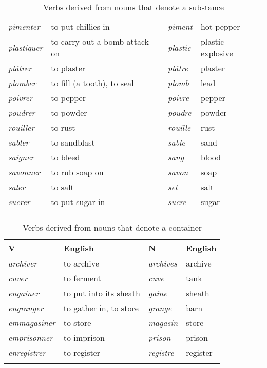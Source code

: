 \documentclass[output=paper]{langsci/langscibook}
\begin{document}
\begin{table}
\begin{tabularx}{\textwidth}{lXll}
\emph{pimenter} & to put chillies in & \emph{piment} & hot pepper\\
\emph{plastiquer} & to carry out a bomb attack on & \emph{plastic} &
plastic explosive\\
\emph{plâtrer} & to plaster & \emph{plâtre} & plaster\\
\emph{plomber} & to fill (a tooth), to seal & \emph{plomb} &
lead\\
\emph{poivrer} & to pepper & \emph{poivre} & pepper\\
\emph{poudrer} & to powder & \emph{poudre} & powder\\
\emph{rouiller} & to rust & \emph{rouille} & rust\\
\emph{sabler} & to sandblast & \emph{sable} & sand\\
\emph{saigner} & to bleed & \emph{sang} & blood\\
\emph{savonner} & to rub soap on & \emph{savon } & soap\\
\emph{saler} & to salt & \emph{sel} & salt\\
\emph{sucrer} & to put sugar in & \emph{sucre} & sugar\\
\lspbottomrule
\end{tabularx}
\caption{Verbs derived from nouns that denote a substance}
\label{tab:Schwarze:9}
\end{table}

\begin{table}
\begin{tabularx}{\textwidth}{lXll}
\lsptoprule
{V} & {English} & {N} &
{English}\\
\midrule

\emph{archiver} & to archive & \emph{archives} & archive\\
\emph{cuver} & to ferment & \emph{cuve} & tank\\
\emph{engainer} & to put into its sheath & \emph{gaine} &
sheath\\
\emph{engranger} & to gather in, to store & \emph{grange} &
barn\\
\emph{emmagasiner} & to store & \emph{magasin} & store\\
\emph{emprisonner} & to imprison & \emph{prison} & prison\\
\emph{enregistrer} & to register & \emph{registre} &
register\\
\lspbottomrule
\end{tabularx}%
\caption{Verbs derived from nouns that denote a container}
\label{tab:Schwarze:10}
\end{table}





{\sloppy
\printbibliography[heading=subbibliography,notkeyword=this]
}
\end{document}

